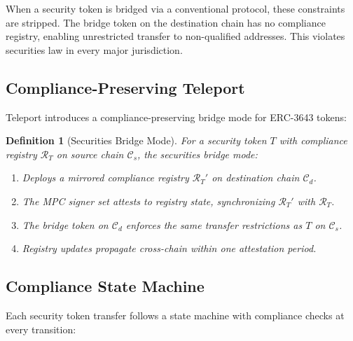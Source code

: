 \documentclass[11pt,twocolumn]{article}
\newtheorem{definition}[theorem]{Definition}
\theoremstyle{definition}
\newcommand{\Chain}{\mathcal{C}}
\begin{document}
When a security token is bridged via a conventional protocol, these constraints are stripped. The bridge token on the destination chain has no compliance registry, enabling unrestricted transfer to non-qualified addresses. This violates securities law in every major jurisdiction.

\subsection{Compliance-Preserving Teleport}

Teleport introduces a compliance-preserving bridge mode for ERC-3643 tokens:

\begin{definition}[Securities Bridge Mode]
\label{def:securities}
For a security token $T$ with compliance registry $\mathcal{R}_T$ on source chain $\Chain_s$, the securities bridge mode:
\begin{enumerate}[nosep]
  \item Deploys a mirrored compliance registry $\mathcal{R}_T'$ on destination chain $\Chain_d$.
  \item The MPC signer set attests to registry state, synchronizing $\mathcal{R}_T'$ with $\mathcal{R}_T$.
  \item The bridge token on $\Chain_d$ enforces the same transfer restrictions as $T$ on $\Chain_s$.
  \item Registry updates propagate cross-chain within one attestation period.
\end{enumerate}
\end{definition}

\subsection{Compliance State Machine}

Each security token transfer follows a state machine with compliance checks at every transition:
\end{document}
